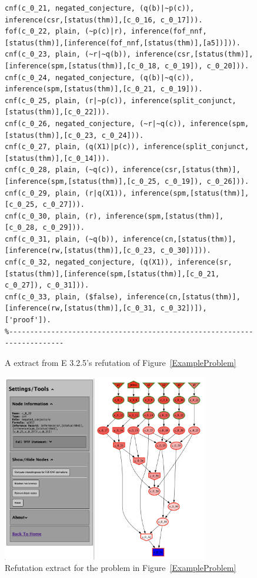 \documentclass[runningheads]{llncs}
\begin{document}
\begin{figure}[htb]
{{\begin{verbatim}
cnf(c_0_21, negated_conjecture, (q(b)|~p(c)), inference(csr,[status(thm)],[c_0_16, c_0_17])).
fof(c_0_22, plain, (~p(c)|r), inference(fof_nnf,[status(thm)],[inference(fof_nnf,[status(thm)],[a5])])).
cnf(c_0_23, plain, (~r|~q(b)), inference(csr,[status(thm)],[inference(spm,[status(thm)],[c_0_18, c_0_19]), c_0_20])).
cnf(c_0_24, negated_conjecture, (q(b)|~q(c)), inference(spm,[status(thm)],[c_0_21, c_0_19])).
cnf(c_0_25, plain, (r|~p(c)), inference(split_conjunct,[status(thm)],[c_0_22])).
cnf(c_0_26, negated_conjecture, (~r|~q(c)), inference(spm,[status(thm)],[c_0_23, c_0_24])).
cnf(c_0_27, plain, (q(X1)|p(c)), inference(split_conjunct,[status(thm)],[c_0_14])).
cnf(c_0_28, plain, (~q(c)), inference(csr,[status(thm)],[inference(spm,[status(thm)],[c_0_25, c_0_19]), c_0_26])).
cnf(c_0_29, plain, (r|q(X1)), inference(spm,[status(thm)],[c_0_25, c_0_27])).
cnf(c_0_30, plain, (r), inference(spm,[status(thm)],[c_0_28, c_0_29])).
cnf(c_0_31, plain, (~q(b)), inference(cn,[status(thm)],[inference(rw,[status(thm)],[c_0_23, c_0_30])])).
cnf(c_0_32, negated_conjecture, (q(X1)), inference(sr,[status(thm)],[inference(spm,[status(thm)],[c_0_21, c_0_27]), c_0_31])).
cnf(c_0_33, plain, ($false), inference(cn,[status(thm)],[inference(rw,[status(thm)],[c_0_31, c_0_32])]), ['proof']).
%------------------------------------------------------------------------
\end{verbatim}
}}
\caption{A extract from E 3.2.5's refutation of Figure~\ref{ExampleProblem}}
\label{ExampleDerivation}
\end{figure}

\begin{figure}[htb]
\centering
\includegraphics[width=0.8\textwidth]{PaperFOFIDV.pdf}
\vspace*{-1em}
\caption{Refutation extract for the problem in Figure~\ref{ExampleProblem}}
\label{Refutation}
\end{figure}
\end{document}
